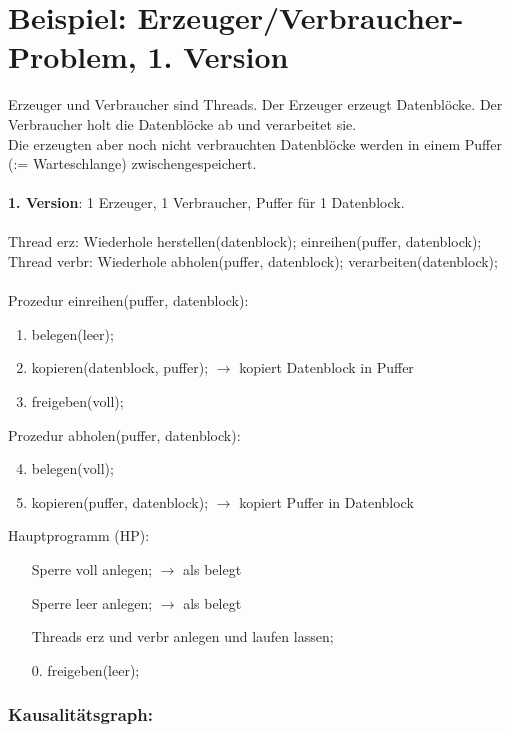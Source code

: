 \section[Beispiel: Erzeuger/Verbraucher (1)]{Beispiel: Erzeuger/Verbraucher-Problem, 1. Version}
Erzeuger und Verbraucher sind Threads. Der Erzeuger erzeugt Datenblöcke. Der Verbraucher holt die Datenblöcke ab und verarbeitet sie.\\
Die erzeugten aber noch nicht verbrauchten Datenblöcke werden in einem Puffer (:= Warteschlange) zwischengespeichert.\\
\\
\textbf{1. Version}: 1 Erzeuger, 1 Verbraucher, Puffer für 1 Datenblock.\\
\\ %
Thread erz:
	Wiederhole
		herstellen(datenblock);
		einreihen(puffer, datenblock);
Thread verbr:
	Wiederhole
		abholen(puffer, datenblock);
		verarbeiten(datenblock);\\
\\
Prozedur einreihen(puffer, datenblock):
\begin{enumerate}
	\item belegen(leer);
	\item kopieren(datenblock, puffer); $\rightarrow$ kopiert Datenblock in Puffer
	\item freigeben(voll);
\end{enumerate}
Prozedur abholen(puffer, datenblock):
\begin{enumerate}
	\setcounter{enumi}{3}
	\item belegen(voll);
	\item kopieren(puffer, datenblock); $\rightarrow$ kopiert Puffer in Datenblock
\end{enumerate}
Hauptprogramm (HP):
\begin{enumerate}
	\item[] Sperre voll anlegen; $\rightarrow$ als belegt
	\item[] Sperre leer anlegen; $\rightarrow$ als belegt
	\item[] Threads erz und verbr anlegen und laufen lassen;
	\item[0.] freigeben(leer);
\end{enumerate}

\subsubsection*{Kausalitätsgraph:} %

